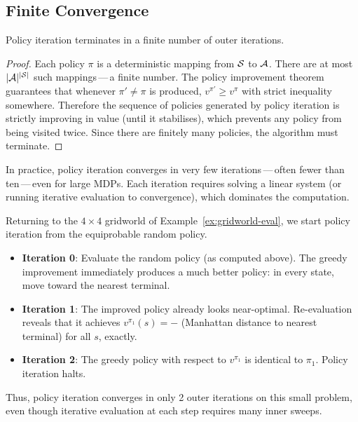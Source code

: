 \subsection*{Finite Convergence}

\begin{theorem}
\label{thm:pi-convergence}
Policy iteration terminates in a finite number of outer iterations.
\end{theorem}

\begin{proof}
Each policy $\pi$ is a deterministic mapping from $\mathcal{S}$ to $\mathcal{A}$.  There are at most $|\mathcal{A}|^{|\mathcal{S}|}$ such mappings\,---\,a finite number.  The policy improvement theorem guarantees that whenever $\pi' \ne \pi$ is produced, $v^{\pi'} \ge v^\pi$ with strict inequality somewhere.  Therefore the sequence of policies generated by policy iteration is strictly improving in value (until it stabilises), which prevents any policy from being visited twice.  Since there are finitely many policies, the algorithm must terminate.
\end{proof}

\begin{remark}
In practice, policy iteration converges in very few iterations\,---\,often fewer than ten\,---\,even for large MDPs.  Each iteration requires solving a linear system (or running iterative evaluation to convergence), which dominates the computation.
\end{remark}

\begin{example}
\label{ex:pi-gridworld}
Returning to the $4\times4$ gridworld of Example~\ref{ex:gridworld-eval}, we start policy iteration from the equiprobable random policy.

\begin{itemize}[leftmargin=*]
\item \textbf{Iteration 0}: Evaluate the random policy (as computed above).  The greedy improvement immediately produces a much better policy: in every state, move toward the nearest terminal.
\item \textbf{Iteration 1}: The improved policy already looks near-optimal.  Re-evaluation reveals that it achieves $v^{\pi_1}(s) = -$ (Manhattan distance to nearest terminal) for all $s$, exactly.
\item \textbf{Iteration 2}: The greedy policy with respect to $v^{\pi_1}$ is identical to $\pi_1$.  Policy iteration halts.
\end{itemize}
Thus, policy iteration converges in only 2 outer iterations on this small problem, even though iterative evaluation at each step requires many inner sweeps.
\end{example}

